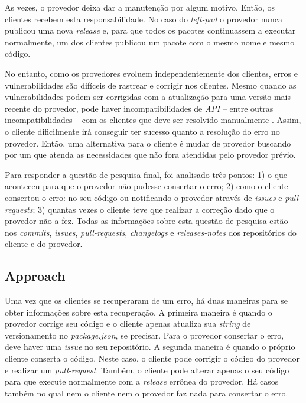 As vezes, o provedor deixa dar a manutenção por algum motivo. Então, os clientes recebem esta responsabilidade. No caso do \textit{left-pad} o provedor nunca publicou uma nova \textit{release} e, para que todos os pacotes continuassem a executar normalmente, um dos clientes publicou um pacote com o mesmo nome e mesmo código.

No entanto, como os provedores evoluem independentemente dos clientes, erros e vulnerabilidades são difíceis de rastrear e corrigir nos clientes. Mesmo quando as vulnerabilidades podem ser corrigidas com a atualização para uma versão mais recente do provedor, pode haver incompatibilidades de \textit{API} -- entre outras incompatibilidades -- com os clientes que deve ser resolvido manualmente \cite{Foo:2018:ESC:3236024.3275535}. Assim, o cliente dificilmente irá conseguir ter sucesso quanto a resolução do erro no provedor. Então, uma alternativa para o cliente é mudar de provedor buscando por um que atenda as necessidades que não fora atendidas pelo provedor prévio.

Para responder a questão de pesquisa final, foi analisado três pontos: 1) o que aconteceu para que o provedor não pudesse consertar o erro; 2) como o cliente consertou o erro: no seu código ou notificando o provedor através de \textit{issues} e \textit{pull-requests}; 3) quantas vezes o cliente teve que realizar a correção dado que o provedor não a fez. Todas as informações sobre esta questão de pesquisa estão nos \textit{commits}, \textit{issues}, \textit{pull-requests}, \textit{changelogs} e \textit{releases-notes} dos repositórios do cliente e do provedor.

\subsection{Approach}
\label{apr:rq3}

Uma vez que os clientes se recuperaram de um erro, há duas maneiras para se obter informações sobre esta recuperação. A primeira maneira é quando o provedor corrige seu código e o cliente apenas atualiza sua \textit{string} de versionamento no \textit{package.json}, se precisar. Para o provedor consertar o erro, deve haver uma \textit{issue} no seu repositório. A segunda maneira é quando o próprio cliente conserta o código. Neste caso, o cliente pode corrigir o código do provedor e realizar um \textit{pull-request}. Também, o cliente pode alterar apenas o seu código para que execute normalmente com a \textit{release} errônea do provedor. Há casos também no qual nem o cliente nem o provedor faz nada para consertar o erro.

